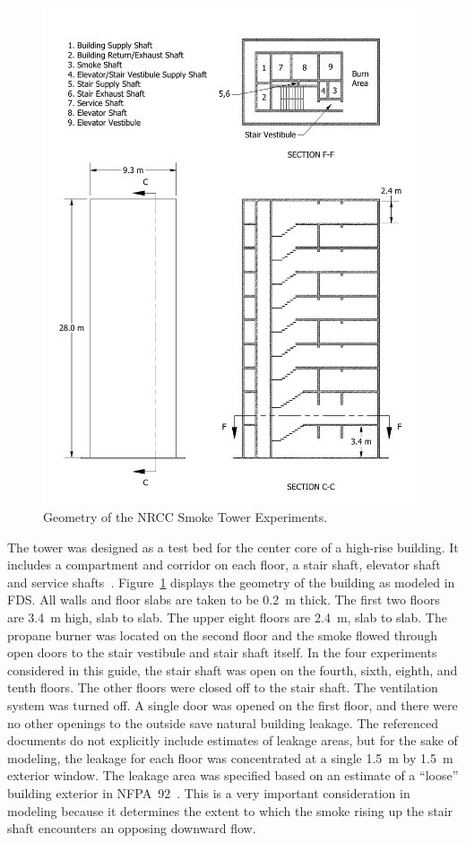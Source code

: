 \begin{figure}[p]
\includegraphics[width=\textwidth]{FIGURES/NRCC_Smoke_Tower/NRCC_Smoke_Tower}
\caption[Geometry of the NRCC Smoke Tower Experiments]{Geometry of the NRCC Smoke Tower Experiments.}
\label{NRCC_Smoke_Tower_Drawing}
\end{figure}

The tower was designed as a test bed for the center core of a high-rise building. It includes a compartment and corridor on each floor, a stair shaft, elevator shaft and service shafts~\cite{Achakji:1987}. Figure~\ref{NRCC_Smoke_Tower_Drawing} displays the geometry of the building as modeled in FDS. All walls and floor slabs are taken to be 0.2~m thick. The first two floors are 3.4~m high, slab to slab. The upper eight floors are 2.4~m, slab to slab. The propane burner was located on the second floor and the smoke flowed through open doors to the stair vestibule and stair shaft itself. In the four experiments considered in this guide, the stair shaft was open on the fourth, sixth, eighth, and tenth floors. The other floors were closed off to the stair shaft. The ventilation system was turned off. A single door was opened on the first floor, and there were no other openings to the outside save natural building leakage. The referenced documents do not explicitly include estimates of leakage areas, but for the sake of modeling, the leakage for each floor was concentrated at a single 1.5~m by 1.5~m exterior window. The leakage area was specified based on an estimate of a ``loose'' building exterior in NFPA~92~\cite{NFPA_92}. This is a very important consideration in modeling because it determines the extent to which the smoke rising up the stair shaft encounters an opposing downward flow.

